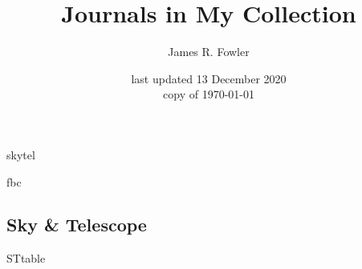 \documentclass[letterpaper]{article}
\begin{document}
\title{Journals in My Collection}
\author{James R. Fowler}
\date{last updated 13 December 2020\\ copy of \today}

  \maketitle

\tableofcontents
\listoftables



{skytel}

{fbc}

\newpage
\appendixpage
\begin{appendix}

  \section{Sky \& Telescope}
  {STtable}

\end{appendix}
\end{document}
